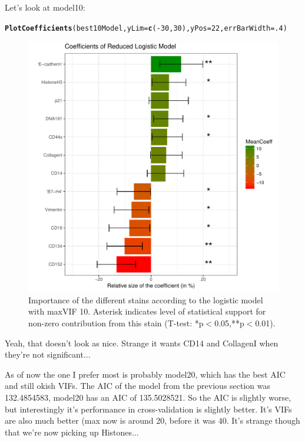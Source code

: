\documentclass[a4paper]{article}\usepackage[]{graphicx}\usepackage[]{color}
\makeatletter
\def\maxwidth{ %
  \ifdim\Gin@nat@width>\linewidth
    \linewidth
  \else
    \Gin@nat@width
  \fi
}
\newcommand{\hlnum}[1]{\textcolor[rgb]{0.686,0.059,0.569}{#1}}%
\newcommand{\hlopt}[1]{\textcolor[rgb]{0,0,0}{#1}}%
\newcommand{\hlstd}[1]{\textcolor[rgb]{0.345,0.345,0.345}{#1}}%
\newcommand{\hlkwc}[1]{\textcolor[rgb]{0.333,0.667,0.333}{#1}}%
\newcommand{\hlkwd}[1]{\textcolor[rgb]{0.737,0.353,0.396}{\textbf{#1}}}%
\newenvironment{kframe}{%
 \def\at@end@of@kframe{}%
 \ifinner\ifhmode%
  \def\at@end@of@kframe{\end{minipage}}%
  \begin{minipage}{\columnwidth}%
 \fi\fi%
 \def\FrameCommand##1{\hskip\@totalleftmargin \hskip-\fboxsep
 \colorbox{shadecolor}{##1}\hskip-\fboxsep
     \hskip-\linewidth \hskip-\@totalleftmargin \hskip\columnwidth}%
 \MakeFramed {\advance\hsize-\width
   \@totalleftmargin\z@ \linewidth\hsize
   \@setminipage}}%
 {\par\unskip\endMakeFramed%
 \at@end@of@kframe}
\newenvironment{knitrout}{}{} %
\makeatother
\begin{document}
Let's look at model10:
\begin{knitrout}
\color{fgcolor}\begin{kframe}
\begin{alltt}
\hlkwd{PlotCoefficients}\hlstd{(best10Model,}\hlkwc{yLim}\hlstd{=}\hlkwd{c}\hlstd{(}\hlopt{-}\hlnum{30}\hlstd{,}\hlnum{30}\hlstd{),}\hlkwc{yPos}\hlstd{=}\hlnum{22}\hlstd{,}\hlkwc{errBarWidth}\hlstd{=}\hlnum{.4}\hlstd{)}
\end{alltt}
\end{kframe}\begin{figure}[h]
\includegraphics[width=\maxwidth]{figure/Fig_Model10-1} \caption[Importance of the different stains according to the logistic model with maxVIF 10]{Importance of the different stains according to the logistic model with maxVIF 10. Asterisk indicates level of statistical support for non-zero contribution from this stain (T-test: *p$<$0.05,**p$<$0.01).}\label{fig:Fig_Model10}
\end{figure}


\end{knitrout}

Yeah, that doesn't look as nice. Strange it wants CD14 and CollagenI when they're not significant...

As of now the one I prefer most is probably model20, which has the best AIC and still okish VIFs. The AIC of the model from the previous section was 132.4854583, model20 has an AIC of 135.5028521. So the AIC is slightly worse, but interestingly it's performance in cross-validation is slightly better. It's VIFs are also much better (max now is around 20, before it was 40. It's strange though that we're now picking up Histones...
\end{document}
